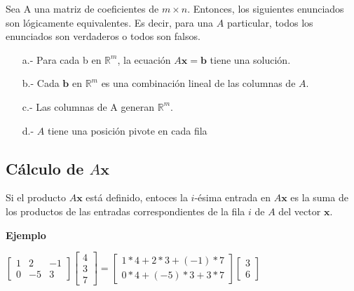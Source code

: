 \documentclass{article}
\begin{document}
\begin{tcolorbox}[colback=red!10!white, colframe=red!70!black, title=Las columnas de $A$ generan $\mathbb{R}^m$]
    Sea A una matriz de coeficientes de $m \times n$. Entonces, los siguientes enunciados son lógicamente equivalentes. Es decir, para una $A$ particular, todos los enunciados son verdaderos o todos son falsos.
    \begin{itemize}
        \item[a.-] Para cada b en $\mathbb{R}^m$, la ecuación $A\mathbf{x} = \mathbf{b}$ tiene una solución.
        \item[b.-] Cada $\mathbf{b}$ en $\mathbb{R}^m$ es una combinación lineal de las columnas de $A$.
        \item[c.-] Las columnas de A generan $\mathbb{R}^m$. 
        \item[d.-] $A$ tiene una posición pivote en cada fila 
    \end{itemize}
\end{tcolorbox}

\subsection*{Cálculo de $A\mathbf{x}$}

\begin{tcolorbox}[colback=green!20!white,colframe=green!80!black,title=Regla Fila-Vector para calcular $A\mathbf{x}$]
    Si el producto $A\mathbf{x}$ está definido, entoces la $i$-ésima entrada en $A\mathbf{x}$ es la suma de los productos de las entradas correspondientes de la fila $i$ de $A$ del vector $\mathbf{x}$.
\end{tcolorbox}

\begin{large}
    \textbf{Ejemplo}
\end{large}

$\begin{bmatrix}
    1 & 2 & -1\\
    0 & -5 & 3
\end{bmatrix}
\begin{bmatrix} 4\\3\\7 \end{bmatrix}
=\begin{bmatrix}
    1*4 + 2*3 + (-1)*7\\
    0*4 + (-5)*3 + 3*7 
\end{bmatrix}
\begin{bmatrix} 3\\6 \end{bmatrix}$
\end{document}
